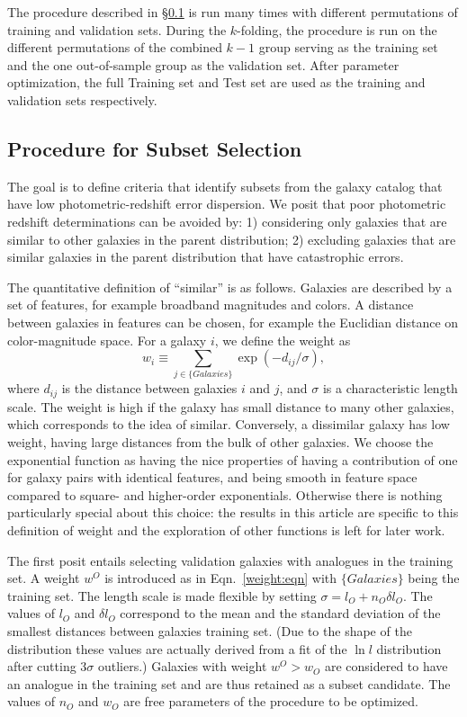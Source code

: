 \documentclass[preprint]{aastex}
\begin{document}
The procedure described in \S\ref{procedure:sec} is  run many times with different permutations
of training and validation sets.  During the $k$-folding, the procedure is run
on the different permutations of the combined $k-1$ group
serving as the training set and the one out-of-sample group as the validation set.  After parameter optimization, the
full Training set and Test set are used as the training and validation sets respectively.

\subsection{Procedure for Subset Selection}
\label{procedure:sec}
The goal is to define criteria that identify subsets from the galaxy catalog that have low photometric-redshift error dispersion.
We posit that poor photometric redshift determinations can be avoided by: 1) considering only galaxies 
that are similar to other galaxies in the parent distribution; 2) excluding galaxies that are similar galaxies in
the parent distribution that have catastrophic errors.

The quantitative definition of ``similar'' is as follows.  Galaxies are described by a set of features, for
example broadband magnitudes and colors.  A distance between galaxies in features can be chosen,
for example the Euclidian distance on color-magnitude space.  For a galaxy $i$, we define the weight  as
\begin{equation}
w_i \equiv \sum_{j \in \{Galaxies\}} \exp{\left(-d_{ij}/\sigma\right)},
\label{weight:eqn}
\end{equation}
where $d_{ij}$ is the distance between galaxies $i$ and $j$, and $\sigma$ is a characteristic
length scale.  The weight is high if the galaxy has small distance to many other galaxies, which corresponds
to the idea of  similar.  Conversely, a dissimilar galaxy has low weight, having large distances from the bulk
of other galaxies.  We choose the exponential function as having the nice properties of having a contribution of one
for galaxy pairs with identical features, and being smooth in feature space compared to square- and higher-order
exponentials.  Otherwise there is nothing particularly special about this choice: the results in this article are
specific to this definition of weight and the exploration of other functions is left for later work.

The first posit entails selecting validation galaxies with analogues in the training set.  A weight $w^O$
is introduced as in  Eqn.\ \ref{weight:eqn} with  $\{Galaxies\}$ being the training set. 
The length scale is made flexible by setting $\sigma = l_O +
n_O\delta l_O$.  The values of $l_O$ and $\delta l_O$ correspond to the mean and the standard deviation
of the smallest distances between galaxies training set.  (Due to the shape of the distribution these values are actually derived
from a fit of the $\ln{l}$ distribution after cutting $3\sigma$ outliers.)  Galaxies with weight $w^O>w_O$ are considered
to have an analogue in the training set and are thus retained as a subset candidate.  The values of $n_O$
and $w_O$ are free parameters of
the procedure to be optimized.
\end{document}
